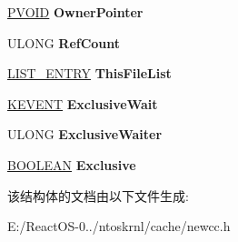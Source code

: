 \begin{DoxyCompactItemize}
\item 
\mbox{\label{struct___n_o_c_c___b_c_b_ae6f9e2c887cf8d7f4c20243b5f02065a}} 
\hyperlink{interfacevoid}{P\+V\+O\+ID} {\bfseries Owner\+Pointer}
\item 
\mbox{\label{struct___n_o_c_c___b_c_b_a80d6616986dea2e75d567f35bef98a12}} 
U\+L\+O\+NG {\bfseries Ref\+Count}
\item 
\mbox{\label{struct___n_o_c_c___b_c_b_a66c05eb9fecb85e5d42bb3282e62b6bc}} 
\hyperlink{struct___l_i_s_t___e_n_t_r_y}{L\+I\+S\+T\+\_\+\+E\+N\+T\+RY} {\bfseries This\+File\+List}
\item 
\mbox{\label{struct___n_o_c_c___b_c_b_a8b4b34fdf333e6aae10be95526051f0b}} 
\hyperlink{struct___k_e_v_e_n_t}{K\+E\+V\+E\+NT} {\bfseries Exclusive\+Wait}
\item 
\mbox{\label{struct___n_o_c_c___b_c_b_af2430ba271687ea30377fd784a8f1d9e}} 
U\+L\+O\+NG {\bfseries Exclusive\+Waiter}
\item 
\mbox{\label{struct___n_o_c_c___b_c_b_a14d9565e8c5d8f7dffbb94441d2ae2f2}} 
\hyperlink{_processor_bind_8h_a112e3146cb38b6ee95e64d85842e380a}{B\+O\+O\+L\+E\+AN} {\bfseries Exclusive}
\end{DoxyCompactItemize}


该结构体的文档由以下文件生成\+:\begin{DoxyCompactItemize}
\item 
E\+:/\+React\+O\+S-\/0../ntoskrnl/cache/newcc.\+h\end{DoxyCompactItemize}
